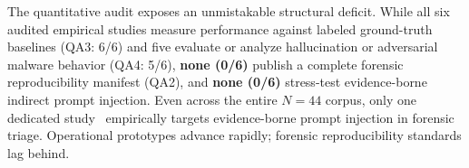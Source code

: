 The quantitative audit exposes an unmistakable structural deficit. While all six audited empirical studies measure performance against labeled ground-truth baselines (QA3: 6/6) and five evaluate or analyze hallucination or adversarial malware behavior (QA4: 5/6), \textbf{none (0/6)} publish a complete forensic reproducibility manifest (QA2), and \textbf{none (0/6)} stress-test evidence-borne indirect prompt injection. Even across the entire $N=44$ corpus, only one dedicated study~\cite{kim2026_evidenceborne} empirically targets evidence-borne prompt injection in forensic triage. Operational prototypes advance rapidly; forensic reproducibility standards lag behind.
